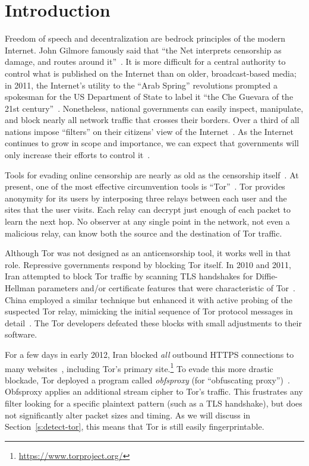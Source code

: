 \section{Introduction}\label{s:intro}

Freedom of speech and decentralization are bedrock principles of the
modern Internet.  John Gilmore famously said that “the Net interprets
censorship as damage, and routes around it”~\cite{q-gilmore}.  It is
more difficult for a central authority to control what is published on
the Internet than on older, broadcast-based media; in 2011, the
Internet's utility to the “Arab Spring” revolutions prompted a
spokesman for the US Department of State to label it “the Che Guevara
of the 21st century”~\cite{q-ross}.  Nonetheless, national governments
can easily inspect, manipulate, and block nearly all network traffic
that crosses their borders. Over a third of all nations impose
“filters” on their citizens' view of the Internet~\cite{n-global}.  As
the Internet continues to grow in scope and importance, we can expect
that governments will only increase their efforts to control
it~\cite{q-celine}.

Tools for evading online censorship are nearly as old as the
censorship itself~\cite{c-peacefire,c-howto-book}.  At present, one of
the most effective circumvention tools is “Tor”~\cite{c-tor}.  Tor
provides anonymity for its users by interposing three relays between
each user and the sites that the user visits.  Each relay can decrypt
just enough of each packet to learn the next hop. No observer at any
single point in the network, not even a malicious relay, can know both
the source and the destination of Tor traffic.

Although Tor was not designed as an anticensorship tool, it works well
in that role.  Repressive governments respond by blocking Tor
itself. In 2010 and 2011, Iran attempted to block Tor traffic by
scanning TLS handshakes for Diffie-Hellman parameters and/or
certificate features that were characteristic of
Tor~\cite{n-iran1,n-iran2}.  China employed a similar technique but
enhanced it with active probing of the suspected Tor relay, mimicking
the initial sequence of Tor protocol messages in
detail~\cite{n-china-active}.  The Tor developers defeated these
blocks with small adjustments to their software.

For a few days in early 2012, Iran blocked \emph{all} outbound HTTPS
connections to many websites~\cite{n-iran3}, including Tor's primary
site.\footnote{\url{https://www.torproject.org/}} To evade this more
drastic blockade, Tor deployed a program called \textit{obfsproxy}
(for “obfuscating proxy”)~\cite{n-iran-ob}.  Obfsproxy applies an
additional stream cipher to Tor's traffic.  This frustrates any filter
looking for a specific plaintext pattern (such as a TLS handshake),
but does not significantly alter packet sizes and timing.  As we will
discuss in Section~\ref{s:detect-tor}, this means that Tor is still
easily fingerprintable.

